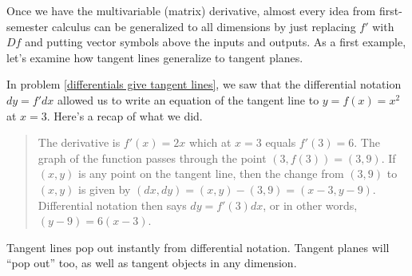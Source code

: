 Once we have the multivariable (matrix) derivative, almost every idea from first-semester calculus can be generalized to all dimensions by just replacing $f'$ with $Df$ and putting vector symbols above the inputs and outputs. As a first example, let's examine how tangent lines generalize to tangent planes.

\begin{remark}
  In problem \ref{differentials give tangent lines}, we saw that the differential notation $dy=f'dx$ allowed us to write an equation of the tangent line to $y=f(x)=x^2$ at $x=3$. Here's a recap of what we did.
\begin{quote} The derivative is $f'(x)=2x$ which at $x=3$ equals $f'(3)= 6$. The graph of the function passes through the point $(3,f(3)) = (3,9)$. If $(x,y)$ is any point on the tangent line, then the change from $(3,9)$ to $(x,y)$ is given by $(dx,dy)=(x,y)-(3,9)=(x-3,y-9)$.  Differential notation then says $dy=f'(3)dx$, or in other words, $(y-9)=6(x-3)$.  
\end{quote}
Tangent lines pop out instantly from differential notation. Tangent planes will ``pop out'' too, as well as tangent objects in any dimension. 
\end{remark}


